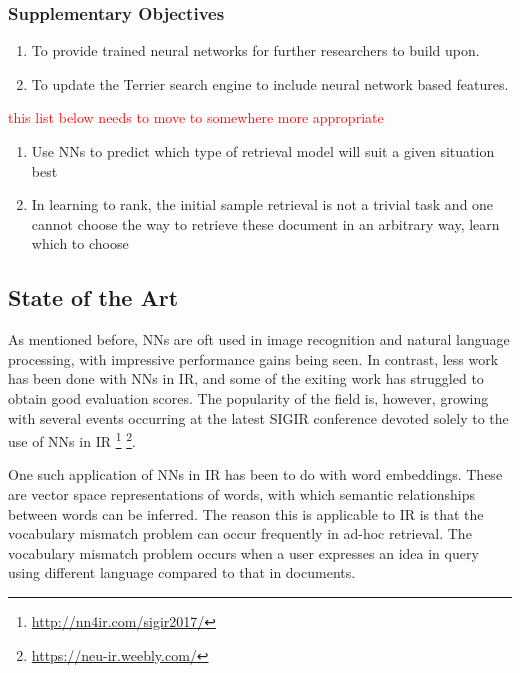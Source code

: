 \documentclass[11pt,english,twocolumn]{article}
\newcommand{\remove}[1]{\textcolor{red}{#1}}
\begin{document}
\subsubsection*{Supplementary Objectives}
\vspace{0.5em}
\begin{enumerate}[label=\textbf{Sup. Obj.\arabic*}, wide=\parindent]
\item To provide trained neural networks for further researchers to build upon.
\item To update the Terrier search engine to include neural network based features.
\end{enumerate}

\remove{this list below needs to move to somewhere more appropriate}

\begin{enumerate}
\item Use NNs to predict which type of retrieval model will suit a given situation best 
\item In learning to rank, the initial sample retrieval is not a trivial task and one cannot choose the way to retrieve these document in an arbitrary way, learn which to choose
\end{enumerate}

\subsection{State of the Art} \label{sec:stateart}
As mentioned before, NNs are oft used in image recognition and natural language processing, with impressive performance gains being seen.
In contrast, less work has been done with NNs in IR, and some of the exiting work has struggled to obtain good evaluation scores.
The popularity of the field is, however, growing with several events occurring at the latest SIGIR conference devoted solely to the use of NNs in IR \footnote{\url{http://nn4ir.com/sigir2017/}} \footnote{\url{https://neu-ir.weebly.com/}}.

One such application of NNs in IR has been to do with word embeddings. These are vector space representations of words, with which semantic relationships between words can be inferred. 
The reason this is applicable to IR is that the vocabulary mismatch problem can occur frequently in ad-hoc retrieval. 
The vocabulary mismatch problem occurs when a user expresses an idea in query using different language compared to that in documents.
\end{document}
